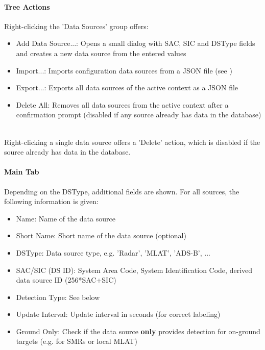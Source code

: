 \paragraph{Tree Actions}

Right-clicking the 'Data Sources' group offers:

\begin{itemize}
\item Add Data Source...: Opens a small dialog with SAC, SIC and DSType fields and creates a new data source from the entered values
\item Import...: Imports configuration data sources from a JSON file (see )
\item Export...: Exports all data sources of the active context as a JSON file
\item Delete All: Removes all data sources from the active context after a confirmation prompt (disabled if any source already has data in the database)
\end{itemize}
\ \\

Right-clicking a single data source offers a 'Delete' action, which is disabled if the source already has data in the database. \\

\paragraph{Main Tab}

Depending on the DSType, additional fields are shown. For all sources, the following information is given:

\begin{itemize}
\item Name: Name of the data source
\item Short Name: Short name of the data source (optional)
\item DSType: Data source type, e.g. 'Radar', 'MLAT', 'ADS-B', ...
\item SAC/SIC (DS ID): System Area Code, System Identification Code, derived data source ID (256*SAC+SIC)
\item Detection Type: See below
\item Update Interval: Update interval in seconds (for correct labeling)
\item Ground Only: Check if the data source \textbf{only} provides detection for on-ground targets (e.g. for SMRs or local MLAT)
\end{itemize}
\ \\


